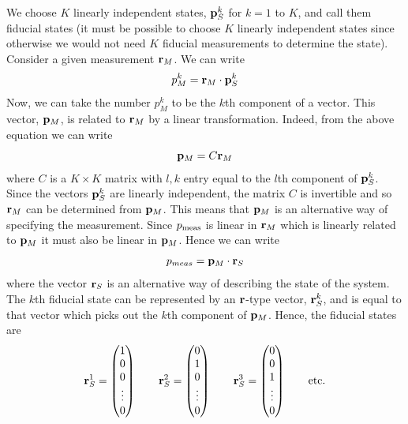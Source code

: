 \documentclass[10pt,twocolumn]{article}
\begin{document}
We choose $K$ linearly independent states, ${\bf p}^k_S$ for $k=1$
to $K$, and call them fiducial
states (it must be possible to choose $K$ linearly independent states
since otherwise we would not need $K$ fiducial measurements to determine
the state).  Consider a given measurement ${\bf r}_M$.  We can write
\begin{equation}
p_M^k = {\bf r}_M \cdot {\bf p}^k_S
\end{equation}
Now, we can take the number $p_M^k$ to be the $k$th component of a
vector.  This vector, ${\bf p}_M$, is related to ${\bf r}_M$ by a linear
transformation.  Indeed, from the above equation we can write
\begin{equation}\label{pCr}
{\bf p}_M = C {\bf r}_M
\end{equation}
where $C$ is a $K\times K$ matrix with $l,k$ entry equal to the $l$th
component of ${\bf p}_S^k$.  Since the vectors ${\bf p}_S^k$ are linearly
independent, the matrix $C$ is invertible and so ${\bf r}_M$
can be determined from ${\bf p}_M$. This means that ${\bf p}_M$ is an
alternative way of specifying the measurement.
Since $p_{\rm meas}$ is linear in
${\bf r}_M$ which is linearly related to ${\bf p}_M$ it must
also be linear in ${\bf p}_M$.  Hence we can write
\begin{equation}\label{formpr}
  p_{meas} = {\bf p}_M \cdot {\bf r}_S
  \end{equation}
where the vector  ${\bf r}_S$ is an alternative way of describing
the state of the system.  The $k$th fiducial state can be represented by an
${\bf r}$-type vector, ${\bf r}^k_S$, and is equal to that vector which
picks out the $k$th component of ${\bf p}_M$.  Hence, the fiducial
states are
\begin{equation}\label{fidS}
{\bf r}^1_S= \left(
\begin{matrix} 1 \\ 0 \\ 0 \\ \vdots \\ 0 \end{matrix} \right) \qquad
{\bf r}^2_S= \left(
\begin{matrix} 0 \\ 1 \\ 0 \\ \vdots \\ 0 \end{matrix} \right) \qquad
{\bf r}^3_S= \left(
\begin{matrix} 0 \\ 0 \\ 1 \\ \vdots \\ 0 \end{matrix} \right) \qquad
{\rm etc.}
\end{equation}
\end{document}
